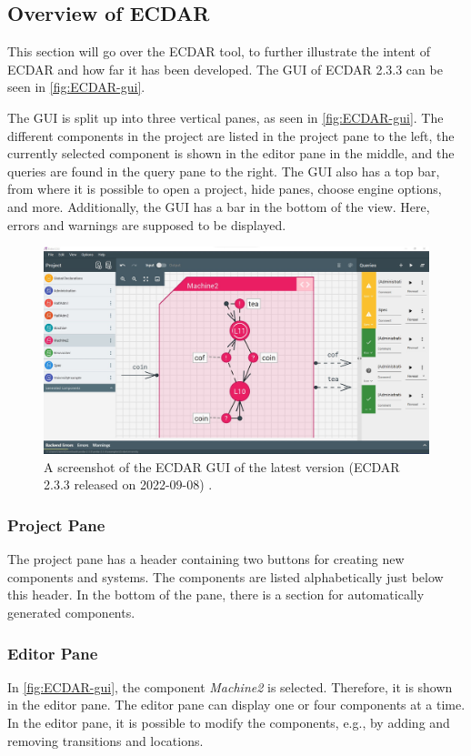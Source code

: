 \subsection{Overview of ECDAR}\label{sub:the-current-state-of-ecdar} 
This section will go over the ECDAR tool, to further illustrate the intent of ECDAR and how far it has been developed. The GUI of ECDAR 2.3.3 can be seen in \autoref{fig:ECDAR-gui}.

The GUI is split up into three vertical panes, as seen in \autoref{fig:ECDAR-gui}. The different components in the project are listed in the project pane to the left, the currently selected component is shown in the editor pane in the middle, and the queries are found in the query pane to the right.
The GUI also has a top bar, from where it is possible to open a project, hide panes, choose engine options, and more.  
Additionally, the GUI has a bar in the bottom of the view. Here, errors and warnings are supposed to be displayed.

\begin{figure}[H]
    \centering
    \includegraphics[width=1\textwidth]{common/figures/ecdar-overview.jpg}
    \caption{A screenshot of the ECDAR GUI of the latest version (ECDAR 2.3.3 released on 2022-09-08) \cite{ECDARNETreleasenotes}.}
    \label{fig:ECDAR-gui}
\end{figure}

\subsubsection{Project Pane}
The project pane has a header containing two buttons for creating new components and systems. The components are listed alphabetically just below this header. 
In the bottom of the pane, there is a section for automatically generated components.

\subsubsection{Editor Pane}
In \autoref{fig:ECDAR-gui}, the component \textit{Machine2} is selected. Therefore, it is shown in the editor pane. The editor pane can display one or four components at a time.
In the editor pane, it is possible to modify the components, e.g., by adding and removing transitions and locations.


